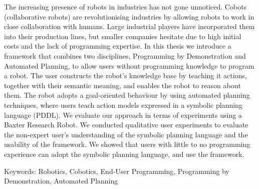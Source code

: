 The increasing presence of robots in industries has not gone unnoticed. 
Cobots (collaborative robots) are revolutionising industries by allowing robots to work in close collaboration with humans.
Large industrial players have incorporated them into their production lines, but smaller companies hesitate due to high initial costs and the lack of programming expertise. 
In this thesis we introduce a framework that combines two disciplines, Programming by Demonstration and Automated Planning, to allow users without programming knowledge to program a robot. 
The user constructs the robot's knowledge base by teaching it actions, together with their semantic meaning, and enables the robot to reason about them. 
The robot adopts a goal-oriented behaviour by using automated planning techniques, where users teach action models expressed in a symbolic planning language (PDDL).
We evaluate our approach in terms of experiments using a Baxter Research Robot.
We conducted qualitative user experiments to evaluate the non-expert user's understanding of the symbolic planning language and the usability of the framework.
We showed that users with little to no programming experience can adopt the symbolic planning language, and use the framework.

Keywords: Robotics, Cobotics, End-User Programming, Programming by Demonstration, Automated Planning
